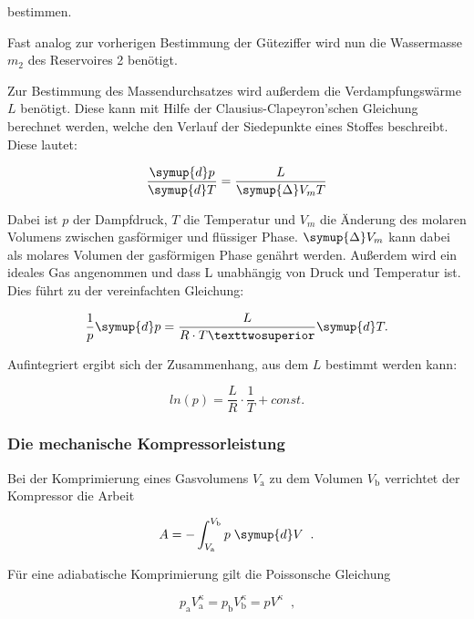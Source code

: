 bestimmen.

Fast analog zur vorherigen Bestimmung der Güteziffer wird nun die Wassermasse
$m_2$ des Reservoires 2 benötigt.

Zur Bestimmung des Massendurchsatzes wird außerdem die Verdampfungswärme $L$
benötigt. Diese kann mit Hilfe der Clausius-Clapeyron'schen Gleichung 
berechnet werden, welche den Verlauf der Siedepunkte eines Stoffes beschreibt. 
Diese lautet: 

\begin{equation*}
\frac{\symup{d}p}{\symup{d}T} = \frac{L}{\symup{\Delta} V_m T}
\end{equation*}

Dabei ist $p$ der Dampfdruck, $T$ die Temperatur und $V_m$ die Änderung 
des molaren Volumens zwischen gasförmiger und flüssiger Phase. $\symup{\Delta} V_m$
kann dabei als molares Volumen der gasförmigen Phase genährt werden. 
Außerdem wird ein ideales Gas angenommen und dass L unabhängig von Druck 
und Temperatur ist. Dies führt zu der vereinfachten Gleichung:

\begin{equation*}
\frac{1}{p}\symup{d}p = \frac{L}{R\cdot T²}\symup{d}T.
\end{equation*}

Aufintegriert ergibt sich der Zusammenhang, aus dem $L$ bestimmt werden 
kann: 

\begin{equation}
ln(p)=\frac{L}{R}\cdot\frac{1}{T}+const.
\label{eqn:Verdampfung2}
\end{equation}

\subsubsection{Die mechanische Kompressorleistung}

Bei der Komprimierung eines Gasvolumens $V_\text{a}$ zu dem Volumen $V_\text{b}$ 
verrichtet der Kompressor die Arbeit

\begin{equation}
    A = - \int^{V_\text{b}}_{V_\text{a}} p \; \symup{d}V \; \; \text{.}
\end{equation}

Für eine adiabatische Komprimierung gilt die Poissonsche Gleichung

\begin{equation}
    p_\text{a} V^\kappa_\text{a} = p_\text{b} V^\kappa_\text{b} = p V^\kappa \; \;
    \text{,}
\end{equation}

